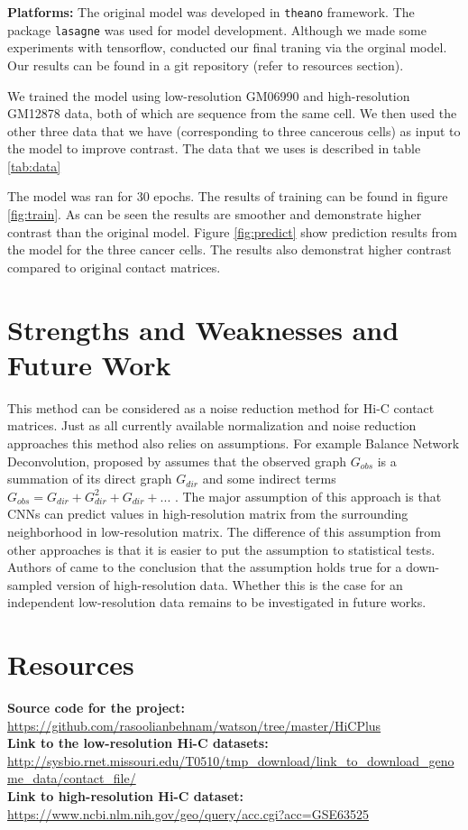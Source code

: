 \documentclass{article}
\begin{document}
\textbf{Platforms:}
The original model was developed in \texttt{theano} 
framework.
The package \texttt{lasagne} was used 
for model development. Although we made some experiments
with tensorflow, conducted our final traning via the
orginal model.
Our results can be found in a git repository (refer to
resources section).

We trained the model using low-resolution 
 GM06990 and high-resolution
 GM12878 data, both of which are sequence from
 the same cell. We then used the other three
 data that we have (corresponding to three
 cancerous cells) as input to the model to 
 improve contrast.
The data that we uses is described in table
\ref{tab:data}

The model was ran for 30 epochs. 
The results of training can be found in figure
\ref{fig:train}. As can be seen the results
are smoother and demonstrate higher contrast
than the original model.
Figure \ref{fig:predict} show prediction results
from the model for the three cancer cells. The
results also demonstrat higher contrast compared
to original contact matrices.



\section{Strengths and Weaknesses and Future Work}
This method can be considered as a noise reduction method
for Hi-C contact matrices. 
Just as all currently available
normalization and noise reduction approaches this method
also relies on assumptions. 
For example Balance Network Deconvolution,
proposed by \cite{feizi2013network}
assumes that the observed graph $G_{obs}$ is a summation of its
direct graph $G_{dir}$ and some indirect terms 
$G_{obs} = G_{dir} + G_{dir}^2 + G_{dir} + ...$ .
The major assumption of this
approach is that CNNs can predict values in high-resolution
matrix from the surrounding neighborhood in low-resolution
matrix. The difference of this assumption from other 
approaches is that it is easier to put the assumption to
statistical tests. Authors of \cite{zhang2018enhancing}
came to the conclusion that the assumption holds true for
a down-sampled version of high-resolution data. Whether
this is the case for an independent low-resolution data
remains to be investigated in future works.
\section{Resources}
\textbf{Source code for the project:}\\
\url{https://github.com/rasoolianbehnam/watson/tree/master/HiCPlus}\\
\textbf{Link to the low-resolution Hi-C datasets:}\\
\url{http://sysbio.rnet.missouri.edu/T0510/tmp_download/link_to_download_genome_data/contact_file/}\\
\textbf{Link to high-resolution Hi-C dataset:}\\
\url{https://www.ncbi.nlm.nih.gov/geo/query/acc.cgi?acc=GSE63525}





\begin{acronym}
\end{acronym}
\end{document}
